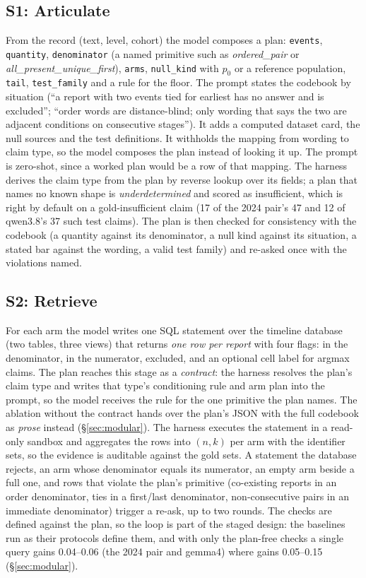 \subsection{S1: Articulate}
\label{sec:frames}

From the record (text, level, cohort) the model composes a plan:
\texttt{events}, \texttt{quantity}, \texttt{denominator} (a named primitive
such as \emph{ordered\_pair} or \emph{all\_present\_unique\_first}), \texttt{arms}, \texttt{null\_kind} with $p_0$
or a reference population, \texttt{tail}, \texttt{test\_family} and a rule for
the floor. The prompt states the codebook by situation (``a report with two
events tied for earliest has no answer and is excluded''; ``order words are
distance-blind; only wording that says the two are adjacent conditions on
consecutive stages''). It adds a computed dataset card, the null sources and
the test definitions. It withholds the mapping from wording to claim type,
so the model composes the plan instead of looking it up. The prompt is
zero-shot, since a worked plan would be a row of that mapping. The harness
derives the claim type from the plan by reverse lookup over its fields; a
plan that names no known shape is \emph{underdetermined} and scored as
insufficient, which is right by default on a gold-insufficient claim (17
of the 2024 pair's 47 and 12 of qwen3.8's 37 such test claims). The plan is then checked for consistency with the codebook (a
quantity against its denominator, a null kind against its situation, a
stated bar against the wording, a valid test family) and re-asked once with
the violations named.

\subsection{S2: Retrieve}

For each arm the model writes one SQL statement over the timeline database
(two tables, three views) that returns \emph{one row per report} with four
flags: in the denominator, in the numerator, excluded, and an optional cell
label for argmax claims. The plan reaches this stage as a \emph{contract}:
the harness resolves the plan's claim type and writes that type's
conditioning rule and arm plan into the prompt, so the model receives the
rule for the one primitive the plan names. The ablation without the contract
hands over the plan's JSON with the full codebook as \emph{prose} instead
(\S\ref{sec:modular}). The harness executes the
statement in a read-only sandbox and aggregates the rows into $(n, k)$ per arm
with the identifier sets, so the evidence is auditable against the gold
sets. A statement the database rejects, an arm whose denominator equals its
numerator, an empty arm beside a full one, and rows that violate the plan's
primitive (co-existing reports in an order denominator, ties in a first/last
denominator, non-consecutive pairs in an immediate denominator) trigger a
re-ask, up to two rounds. The checks are defined against the plan, so the
loop is part of the staged design: the baselines run as their protocols
define them, and with only the plan-free checks a single query gains
0.04--0.06 (the 2024 pair and gemma4) where \art{} gains 0.05--0.15
(\S\ref{sec:modular}).

